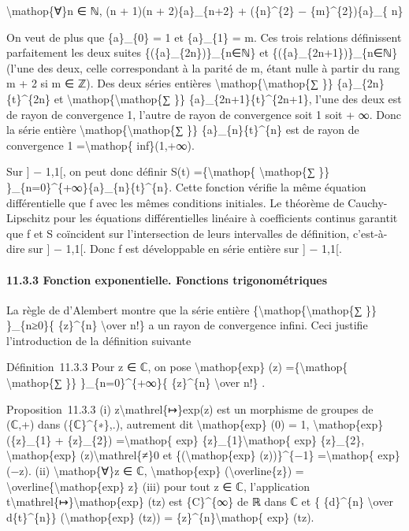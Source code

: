 \documentclass[]{article}
\begin{document}
\textbackslash{}mathop\{∀\}n ∈ ℕ, (n + 1)(n + 2)\{a\}\_\{n+2\} +
(\{n\}\^{}\{2\} − \{m\}\^{}\{2\})\{a\}\_\{ n\}

On veut de plus que \{a\}\_\{0\} = 1 et \{a\}\_\{1\} = m. Ces trois
relations définissent parfaitement les deux suites
\{(\{a\}\_\{2n\})\}\_\{n∈ℕ\} et \{(\{a\}\_\{2n+1\})\}\_\{n∈ℕ\} (l'une
des deux, celle correspondant à la parité de m, étant nulle à partir du
rang \textbar{}m\textbar{} + 2 si m ∈ ℤ). Des deux séries entières
\textbackslash{}mathop\{\textbackslash{}mathop\{∑ \}\}
\{a\}\_\{2n\}\{t\}\^{}\{2n\} et
\textbackslash{}mathop\{\textbackslash{}mathop\{∑ \}\}
\{a\}\_\{2n+1\}\{t\}\^{}\{2n+1\}, l'une des deux est de rayon de
convergence 1, l'autre de rayon de convergence soit 1 soit + ∞. Donc la
série entière \textbackslash{}mathop\{\textbackslash{}mathop\{∑ \}\}
\{a\}\_\{n\}\{t\}\^{}\{n\} est de rayon de convergence 1
=\textbackslash{}mathop\{ inf\}(1,+∞).

Sur {]} − 1,1{[}, on peut donc définir S(t) =\{\textbackslash{}mathop\{
\textbackslash{}mathop\{∑ \}\}
\}\_\{n=0\}\^{}\{+∞\}\{a\}\_\{n\}\{t\}\^{}\{n\}. Cette fonction vérifie
la même équation différentielle que f avec les mêmes conditions
initiales. Le théorème de Cauchy-Lipschitz pour les équations
différentielles linéaire à coefficients continus garantit que f et S
coïncident sur l'intersection de leurs intervalles de définition,
c'est-à-dire sur {]} − 1,1{[}. Donc f est développable en série entière
sur {]} − 1,1{[}.

\paragraph{11.3.3 Fonction exponentielle. Fonctions trigonométriques}

La règle de d'Alembert montre que la série entière
\{\textbackslash{}mathop\{\textbackslash{}mathop\{∑ \}\} \}\_\{n≥0\}\{
\{z\}\^{}\{n\} \textbackslash{}over n!\} a un rayon de convergence
infini. Ceci justifie l'introduction de la définition suivante

Définition~11.3.3 Pour z ∈ ℂ, on pose \textbackslash{}mathop\{exp\} (z)
=\{\textbackslash{}mathop\{ \textbackslash{}mathop\{∑ \}\}
\}\_\{n=0\}\^{}\{+∞\}\{ \{z\}\^{}\{n\} \textbackslash{}over n!\} .

Proposition~11.3.3 (i) z\textbackslash{}mathrel\{↦\}exp(z) est un
morphisme de groupes de (ℂ,+) dans (\{ℂ\}\^{}\{∗\},.), autrement dit
\textbackslash{}mathop\{exp\} (0) = 1, \textbackslash{}mathop\{exp\}
(\{z\}\_\{1\} + \{z\}\_\{2\}) =\textbackslash{}mathop\{ exp\}
\{z\}\_\{1\}\textbackslash{}mathop\{ exp\} \{z\}\_\{2\},
\textbackslash{}mathop\{exp\} (z)\textbackslash{}mathrel\{≠\}0 et
\{(\textbackslash{}mathop\{exp\} (z))\}\^{}\{−1\}
=\textbackslash{}mathop\{ exp\} (−z). (ii) \textbackslash{}mathop\{∀\}z
∈ ℂ, \textbackslash{}mathop\{exp\} (\textbackslash{}overline\{z\}) =
\textbackslash{}overline\{\textbackslash{}mathop\{exp\} z\} (iii) pour
tout z ∈ ℂ, l'application
t\textbackslash{}mathrel\{↦\}\textbackslash{}mathop\{exp\} (tz) est
\{C\}\^{}\{∞\} de ℝ dans ℂ et \{ \{d\}\^{}\{n\} \textbackslash{}over
d\{t\}\^{}\{n\}\} (\textbackslash{}mathop\{exp\} (tz)) =
\{z\}\^{}\{n\}\textbackslash{}mathop\{ exp\} (tz).
\end{document}
